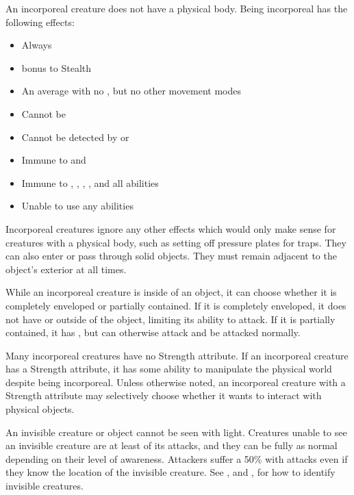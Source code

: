   An incorporeal creature does not have a physical body.
  Being incorporeal has the following effects:
  \begin{itemize}
    \item Always 
    \item {} bonus to Stealth 
    \item An average  with no , but no other movement modes
    \item Cannot be 
    \item Cannot be detected by  or 
    \item Immune to \squeezing and 
    \item Immune to \atBrawling, \atCreation, \atManifestation, \atPhysical, and all  abilities
    \item Unable to use any  \atPhysical abilities
  \end{itemize}

  Incorporeal creatures ignore any other effects which would only make sense for creatures with a physical body, such as setting off pressure plates for traps.
  They can also enter or pass through solid objects.
  They must remain adjacent to the object's exterior at all times.

  While an incorporeal creature is inside of an object, it can choose whether it is completely enveloped or partially contained.
  If it is completely enveloped, it does not have  or  outside of the object, limiting its ability to attack.
  If it is partially contained, it has , but can otherwise attack and be attacked normally.

  Many incorporeal creatures have no Strength attribute.
  If an incorporeal creature has a Strength attribute, it has some ability to manipulate the physical world despite being incorporeal.
  Unless otherwise noted, an incorporeal creature with a Strength attribute may selectively choose whether it wants to interact with physical objects.

  \label{Invisible}
  An invisible creature or object cannot be seen with light.
  Creatures unable to see an invisible creature are at least \partiallyunaware of its attacks, and they can be fully \unaware as normal depending on their level of awareness.
  Attackers suffer a 50\%  with  attacks even if they know the location of the invisible creature.
  See , and , for how to identify invisible creatures.

